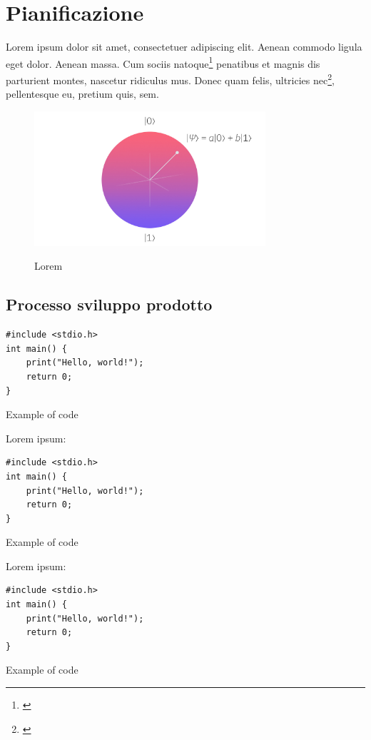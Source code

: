 \chapter{Pianificazione}
\label{chap:processi-metodologie}



Lorem ipsum dolor sit amet, consectetuer adipiscing elit. Aenean commodo ligula eget dolor. Aenean massa. Cum sociis natoque\footnote{\cite{site:agile-manifesto}} penatibus et magnis dis parturient montes, nascetur ridiculus mus. Donec quam felis, ultricies nec\footnote{\cite{article:spooky}}, pellentesque eu, pretium quis, sem.

\begin{figure}[H]
    \centering
    \includegraphics[alt={Testo alternativo dell'immagine}, height=5cm]{img/qubit.jpeg}
    \caption{Lorem}
    \label{fig:qubit}
\end{figure}
\lipsum[1]

\section{Processo sviluppo prodotto}
\lipsum[1-2]

\begin{listing}[H]
\begin{verbatim}
#include <stdio.h>
int main() {
    print("Hello, world!");
    return 0;
}
\end{verbatim}
\caption{Example of code}
\label{listing:b}
\end{listing}

Lorem ipsum:
\begin{listing}[H]
\begin{verbatim}
#include <stdio.h>
int main() {
    print("Hello, world!");
    return 0;
}
\end{verbatim}
\caption{Example of code}
\label{listing:b-2}
\end{listing}

Lorem ipsum:
\begin{listing}[H]
\begin{verbatim}
#include <stdio.h>
int main() {
    print("Hello, world!");
    return 0;
}
\end{verbatim}
\caption{Example of code}
\label{listing:b-3}
\end{listing}

\newpage
